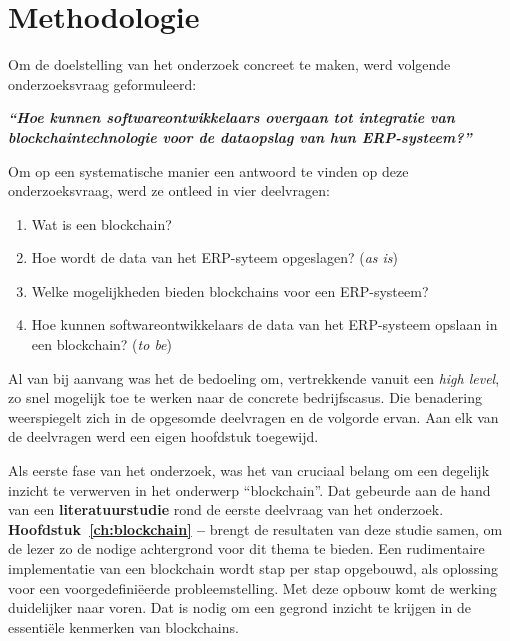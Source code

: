 
\chapter{Methodologie}
\label{ch:methodologie}


Om de doelstelling van het onderzoek concreet te maken, werd volgende onderzoeksvraag geformuleerd:

\begin{center}
	\textit{\textbf{``Hoe kunnen softwareontwikkelaars overgaan tot integratie van blockchaintechnologie voor de dataopslag van hun ERP-systeem?''}}
\end{center}

Om op een systematische manier een antwoord te vinden op deze onderzoeksvraag, werd ze ontleed in vier deelvragen:

\begin{enumerate}
	\item Wat is een blockchain?
	\item Hoe wordt de data van het ERP-syteem opgeslagen? (\textit{as is})
	\item Welke mogelijkheden bieden blockchains voor een ERP-systeem?
	\item Hoe kunnen softwareontwikkelaars de data van het ERP-systeem opslaan in een blockchain? (\textit{to be})
\end{enumerate}

Al van bij aanvang was het de bedoeling om, vertrekkende vanuit een \textit{high level}, zo snel mogelijk toe te werken naar de concrete bedrijfscasus. Die benadering weerspiegelt zich in de opgesomde deelvragen en de volgorde ervan.
Aan elk van de deelvragen werd een eigen hoofdstuk toegewijd.

Als eerste fase van het onderzoek, was het van cruciaal belang om een degelijk inzicht te verwerven in het onderwerp ``blockchain''. Dat gebeurde aan de hand van een \textbf{literatuurstudie} rond de eerste deelvraag van het onderzoek.
\textbf{Hoofdstuk~\ref{ch:blockchain} -- } brengt de resultaten van deze studie samen, om de lezer zo de nodige achtergrond voor dit thema te bieden. Een rudimentaire implementatie van een blockchain wordt stap per stap opgebouwd, als oplossing voor een voorgedefiniëerde probleemstelling. Met deze opbouw komt de werking duidelijker naar voren. Dat is nodig om een gegrond inzicht te krijgen in de essentiële kenmerken van blockchains.

